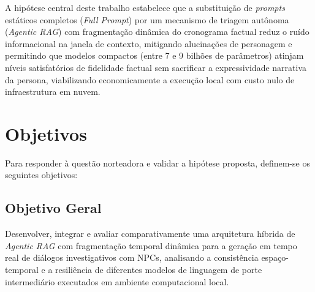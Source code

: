 A hipótese central deste trabalho estabelece que a substituição de \textit{prompts} estáticos completos (\textit{Full Prompt}) por um mecanismo de triagem autônoma (\textit{Agentic RAG}) com fragmentação dinâmica do cronograma factual reduz o ruído informacional na janela de contexto, mitigando alucinações de personagem e permitindo que modelos compactos (entre 7 e 9 bilhões de parâmetros) atinjam níveis satisfatórios de fidelidade factual sem sacrificar a expressividade narrativa da persona, viabilizando economicamente a execução local com custo nulo de infraestrutura em nuvem.

\section{Objetivos}
\label{sec:objetivos}

Para responder à questão norteadora e validar a hipótese proposta, definem-se os seguintes objetivos:

\subsection{Objetivo Geral}
Desenvolver, integrar e avaliar comparativamente uma arquitetura híbrida de \textit{Agentic RAG} com fragmentação temporal dinâmica para a geração em tempo real de diálogos investigativos com NPCs, analisando a consistência espaço-temporal e a resiliência de diferentes modelos de linguagem de porte intermediário executados em ambiente computacional local.

